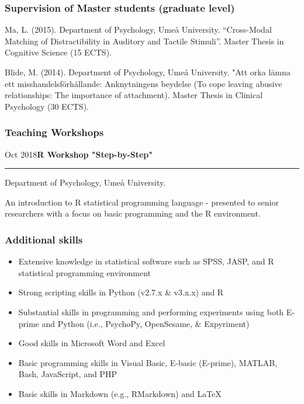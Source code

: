 \documentclass[]{article}
\providecommand{\tightlist}{%
  \setlength{\itemsep}{0pt}\setlength{\parskip}{0pt}}
\begin{document}
\hypertarget{supervision-of-master-students-graduate-level}{%
\subsubsection{Supervision of Master students (graduate
level)}\label{supervision-of-master-students-graduate-level}}

Ma, L. (2015). Department of Psychology, Umeå University. ``Cross-Modal
Matching of Distractibility in Auditory and Tactile Stimuli''. Master
Thesis in Cognitive Science (15 ECTS).

Blide, M. (2014). Department of Psychology, Umeå University. "Att orka
lämna ett misshandelsförhållande: Anknytningens beydelse (To cope
leaving abusive relationships: The importance of attachment). Master
Thesis in Clinical Psychology (30 ECTS).

\hypertarget{teaching-workshops}{%
\subsubsection{Teaching Workshops}\label{teaching-workshops}}

Oct 2018\hspace{0.75cm}\textbf{R Workshop "Step-by-Step"}\vspace{1mm}

\hrule
\begin{changemargin}{2.15cm}{2.4cm}


Department of Psychology, Umeå University.

An introduction to R statistical programming language - presented to senior researchers with a focus on basic programming and the R environment.

\end{changemargin}

\hypertarget{additional-skills}{%
\subsubsection{Additional skills}\label{additional-skills}}

\begin{itemize}
\tightlist
\item
  Extensive knowledge in statistical software such as SPSS, JASP, and R
  statistical programming environment
\item
  Strong scripting skills in Python (v2.7.x \& v3.x.x) and R
\item
  Substantial skills in programming and performing experiments using
  both E-prime and Python (i.e., PsychoPy, OpenSesame, \& Expyriment)
\item
  Good skills in Microsoft Word and Excel
\item
  Basic programming skills in Visual Basic, E-basic (E-prime), MATLAB,
  Bash, JavaScript, and PHP
\item
  Basic skills in Markdown (e.g., RMarkdown) and \LaTeX
\end{itemize}
\end{document}
